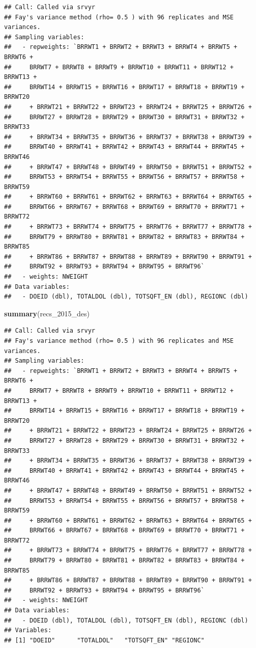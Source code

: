 \documentclass[
]{krantz}
\makeatletter
\newenvironment{Shaded}{\begin{snugshade}}{\end{snugshade}}
\newcommand{\FunctionTok}[1]{\textcolor[rgb]{0.27,0.27,0.27}{\textbf{#1}}}
\newcommand{\NormalTok}[1]{#1}
\newenvironment{kframe}{%
\medskip{}
\setlength{\fboxsep}{.8em}
 \def\at@end@of@kframe{}%
 \ifinner\ifhmode%
  \def\at@end@of@kframe{\end{minipage}}%
  \begin{minipage}{\columnwidth}%
 \fi\fi%
 \def\FrameCommand##1{\hskip\@totalleftmargin \hskip-\fboxsep
 \colorbox{shadecolor}{##1}\hskip-\fboxsep
     \hskip-\linewidth \hskip-\@totalleftmargin \hskip\columnwidth}%
 \MakeFramed {\advance\hsize-\width
   \@totalleftmargin\z@ \linewidth\hsize
   \@setminipage}}%
 {\par\unskip\endMakeFramed%
 \at@end@of@kframe}
\renewenvironment{Shaded}{\begin{kframe}}{\end{kframe}}
\makeatother
\begin{document}
\begin{verbatim}
## Call: Called via srvyr
## Fay's variance method (rho= 0.5 ) with 96 replicates and MSE variances.
## Sampling variables:
##   - repweights: `BRRWT1 + BRRWT2 + BRRWT3 + BRRWT4 + BRRWT5 + BRRWT6 +
##     BRRWT7 + BRRWT8 + BRRWT9 + BRRWT10 + BRRWT11 + BRRWT12 + BRRWT13 +
##     BRRWT14 + BRRWT15 + BRRWT16 + BRRWT17 + BRRWT18 + BRRWT19 + BRRWT20
##     + BRRWT21 + BRRWT22 + BRRWT23 + BRRWT24 + BRRWT25 + BRRWT26 +
##     BRRWT27 + BRRWT28 + BRRWT29 + BRRWT30 + BRRWT31 + BRRWT32 + BRRWT33
##     + BRRWT34 + BRRWT35 + BRRWT36 + BRRWT37 + BRRWT38 + BRRWT39 +
##     BRRWT40 + BRRWT41 + BRRWT42 + BRRWT43 + BRRWT44 + BRRWT45 + BRRWT46
##     + BRRWT47 + BRRWT48 + BRRWT49 + BRRWT50 + BRRWT51 + BRRWT52 +
##     BRRWT53 + BRRWT54 + BRRWT55 + BRRWT56 + BRRWT57 + BRRWT58 + BRRWT59
##     + BRRWT60 + BRRWT61 + BRRWT62 + BRRWT63 + BRRWT64 + BRRWT65 +
##     BRRWT66 + BRRWT67 + BRRWT68 + BRRWT69 + BRRWT70 + BRRWT71 + BRRWT72
##     + BRRWT73 + BRRWT74 + BRRWT75 + BRRWT76 + BRRWT77 + BRRWT78 +
##     BRRWT79 + BRRWT80 + BRRWT81 + BRRWT82 + BRRWT83 + BRRWT84 + BRRWT85
##     + BRRWT86 + BRRWT87 + BRRWT88 + BRRWT89 + BRRWT90 + BRRWT91 +
##     BRRWT92 + BRRWT93 + BRRWT94 + BRRWT95 + BRRWT96` 
##   - weights: NWEIGHT 
## Data variables: 
##   - DOEID (dbl), TOTALDOL (dbl), TOTSQFT_EN (dbl), REGIONC (dbl)
\end{verbatim}

\begin{Shaded}
\begin{Highlighting}[]
\FunctionTok{summary}\NormalTok{(recs\_2015\_des)}
\end{Highlighting}
\end{Shaded}

\begin{verbatim}
## Call: Called via srvyr
## Fay's variance method (rho= 0.5 ) with 96 replicates and MSE variances.
## Sampling variables:
##   - repweights: `BRRWT1 + BRRWT2 + BRRWT3 + BRRWT4 + BRRWT5 + BRRWT6 +
##     BRRWT7 + BRRWT8 + BRRWT9 + BRRWT10 + BRRWT11 + BRRWT12 + BRRWT13 +
##     BRRWT14 + BRRWT15 + BRRWT16 + BRRWT17 + BRRWT18 + BRRWT19 + BRRWT20
##     + BRRWT21 + BRRWT22 + BRRWT23 + BRRWT24 + BRRWT25 + BRRWT26 +
##     BRRWT27 + BRRWT28 + BRRWT29 + BRRWT30 + BRRWT31 + BRRWT32 + BRRWT33
##     + BRRWT34 + BRRWT35 + BRRWT36 + BRRWT37 + BRRWT38 + BRRWT39 +
##     BRRWT40 + BRRWT41 + BRRWT42 + BRRWT43 + BRRWT44 + BRRWT45 + BRRWT46
##     + BRRWT47 + BRRWT48 + BRRWT49 + BRRWT50 + BRRWT51 + BRRWT52 +
##     BRRWT53 + BRRWT54 + BRRWT55 + BRRWT56 + BRRWT57 + BRRWT58 + BRRWT59
##     + BRRWT60 + BRRWT61 + BRRWT62 + BRRWT63 + BRRWT64 + BRRWT65 +
##     BRRWT66 + BRRWT67 + BRRWT68 + BRRWT69 + BRRWT70 + BRRWT71 + BRRWT72
##     + BRRWT73 + BRRWT74 + BRRWT75 + BRRWT76 + BRRWT77 + BRRWT78 +
##     BRRWT79 + BRRWT80 + BRRWT81 + BRRWT82 + BRRWT83 + BRRWT84 + BRRWT85
##     + BRRWT86 + BRRWT87 + BRRWT88 + BRRWT89 + BRRWT90 + BRRWT91 +
##     BRRWT92 + BRRWT93 + BRRWT94 + BRRWT95 + BRRWT96` 
##   - weights: NWEIGHT 
## Data variables: 
##   - DOEID (dbl), TOTALDOL (dbl), TOTSQFT_EN (dbl), REGIONC (dbl)
## Variables: 
## [1] "DOEID"      "TOTALDOL"   "TOTSQFT_EN" "REGIONC"
\end{verbatim}
\end{document}
